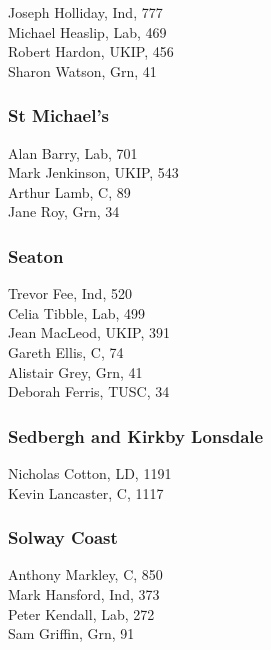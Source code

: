\documentclass[a4paper,openany,10pt]{book}
\begin{document}
Joseph Holliday, Ind, 777\\
Michael Heaslip, Lab, 469\\
Robert Hardon, UKIP, 456\\
Sharon Watson, Grn, 41\\


\subsubsection*{St Michael's}



Alan Barry, Lab, 701\\
Mark Jenkinson, UKIP, 543\\
Arthur Lamb, C, 89\\
Jane Roy, Grn, 34\\


\subsubsection*{Seaton}



Trevor Fee, Ind, 520\\
Celia Tibble, Lab, 499\\
Jean MacLeod, UKIP, 391\\
Gareth Ellis, C, 74\\
Alistair Grey, Grn, 41\\
Deborah Ferris, TUSC, 34\\


\subsubsection*{Sedbergh and Kirkby Lonsdale}



Nicholas Cotton, LD, 1191\\
Kevin Lancaster, C, 1117\\


\subsubsection*{Solway Coast}



Anthony Markley, C, 850\\
Mark Hansford, Ind, 373\\
Peter Kendall, Lab, 272\\
Sam Griffin, Grn, 91\\
\end{document}
